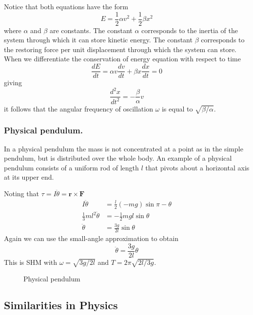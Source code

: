 \documentclass[../../main.tex]{subfiles}
\begin{document}
Notice that both equations have the form
\begin{equation*}
    E=\frac{1}{2}\alpha v^2+\frac{1}{2}\beta x^2
\end{equation*}
where $\alpha$ and $\beta$ are constants. The constant $\alpha$ corresponds to the inertia of the system through which it can store kinetic energy. The constant $\beta$ corresponds to the restoring force per unit displacement through which the system can store. When we differentiate the conservation of energy equation with respect to time 
\begin{equation*}
    \frac{dE}{dt}=\alpha v\frac{dv}{dt}+\beta x\frac{dx}{dt}=0
\end{equation*}
giving
\begin{equation*}
    \frac{d^2x}{dt^2}=-\frac{\beta}{\alpha}v
\end{equation*}
it follows that the angular frequency of oscillation $\omega$ is equal to $\sqrt{\beta/\alpha}$.

\subsubsection{Physical pendulum.} In a physical pendulum the mass is not concentrated at a point as in the simple pendulum, but is distributed over the whole body. An example of a physical pendulum consists of a uniform rod of length $l$ that pivots about a horizontal axis at its upper end. 

Noting that $\tau=I\ddot{\theta}=\mathbf{r}\times\mathbf{F}$
\begin{align*}
    I\ddot{\theta}&=\frac{l}{2}(-mg)\sin \pi-\theta\\
    \frac{1}{3}ml^2\ddot{\theta}&=-\frac{1}{2}mgl\sin \theta\\
    \ddot{\theta}&=\frac{3g}{2l}\sin\theta
\end{align*}
Again we can use the small-angle approximation to obtain
\begin{equation*}
    \ddot{\theta}=\frac{3g}{2l}\theta
\end{equation*}
This is SHM with $\omega = \sqrt{3g/2l} $ and $T = 2\pi \sqrt{2l/3g}$.
\begin{figure}[h]
    \centering
    \caption*{Physical pendulum}
\end{figure}

\subsection{Similarities in Physics}
\end{document}
